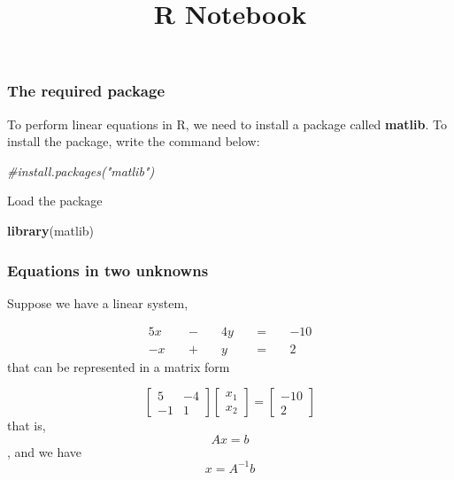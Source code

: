 \documentclass[
]{article}
\title{R Notebook}
\author{}
\date{\vspace{-2.5em}}
\newenvironment{Shaded}{\begin{snugshade}}{\end{snugshade}}
\newcommand{\CommentTok}[1]{\textcolor[rgb]{0.56,0.35,0.01}{\textit{#1}}}
\newcommand{\KeywordTok}[1]{\textcolor[rgb]{0.13,0.29,0.53}{\textbf{#1}}}
\newcommand{\NormalTok}[1]{#1}
\begin{document}
\maketitle

\hypertarget{the-required-package}{%
\subsubsection{The required package}\label{the-required-package}}

To perform linear equations in R, we need to install a package called
\textbf{matlib}. To install the package, write the command below:

\begin{Shaded}
\begin{Highlighting}[]
\CommentTok{#install.packages("matlib")}
\end{Highlighting}
\end{Shaded}

Load the package

\begin{Shaded}
\begin{Highlighting}[]
\KeywordTok{library}\NormalTok{(matlib)}
\end{Highlighting}
\end{Shaded}

\hypertarget{equations-in-two-unknowns}{%
\subsubsection{Equations in two
unknowns}\label{equations-in-two-unknowns}}

Suppose we have a linear system,

\[
\begin{alignat*}{7}
5x &&\; - \;&& 4y             &&\; = \;&& -10  \\
-x &&\; + \;&& y             &&\; = \;&& 2 
\end{alignat*}
\] that can be represented in a matrix form

\[
\begin{bmatrix}
    5 & -4 \\
  -1 & 1
  \end{bmatrix}
    \begin{bmatrix}
      x_{1} \\
    x_{2}
    \end{bmatrix}
    =
    \begin{bmatrix}
    -10 \\
    2 
    \end{bmatrix}
\] that is, \[Ax=b\], and we have \[ x = A^{-1}b\]
\end{document}

